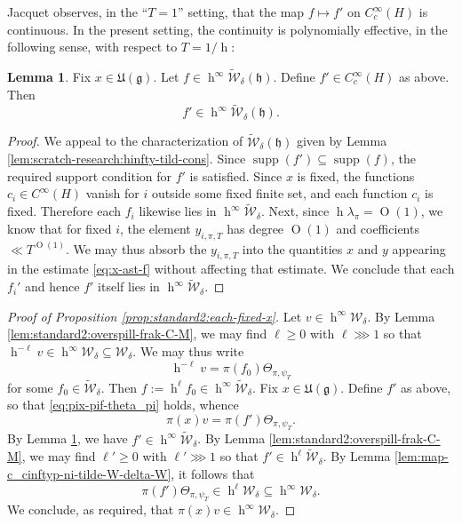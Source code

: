 \documentclass[reqno]{amsart}
\DeclareMathOperator{\h}{h}
\def\O{\operatorname{O}}
\DeclareMathOperator{\supp}{supp}
\theoremstyle{plain} \newtheorem{theorem} {Theorem}
\theoremstyle{definition} \newtheorem{definition} [theorem] {Definition}
\theoremstyle{itplain} %
\newtheorem{lemma}[theorem]{Lemma}
\numberwithin{equation}{section}
\numberwithin{theorem}{section}
\renewcommand{\geq}{\geqslant}
\begin{document}
Jacquet observes, in the ``$T=1$'' setting, that the map $f \mapsto f'$ on $C_c^\infty(H)$ is continuous.  In the present setting, the continuity is polynomially effective, in the following sense, with respect to $T = 1/\h$:
\begin{lemma}\label{lem:scratch-research:fix-x-in}
  Fix $x \in \mathfrak{U}(\mathfrak{g})$.  Let $f \in \h^\infty \tilde{\mathcal{W}}_\delta(\mathfrak{h})$.   Define $f' \in C_c^\infty(H)$ as above.  Then
  \begin{equation*}
    f' \in \h^\infty \tilde{\mathcal{W}}_\delta(\mathfrak{h}).
  \end{equation*}
\end{lemma}
\begin{proof}
  We appeal to the characterization of $\tilde{\mathcal{W}}_\delta(\mathfrak{h})$ given by Lemma \ref{lem:scratch-research:hinfty-tild-cons}.  Since $\supp(f') \subseteq \supp(f)$, the required support condition for $f'$ is satisfied.  Since $x$ is fixed, the functions $c_i \in C^\infty(H)$ vanish for $i$ outside some fixed finite set, and each function $c_i$ is fixed.  Therefore each $f_i$ likewise lies in $\h^\infty \tilde{\mathcal{W}}_\delta$.  Next, since $\h \lambda_\pi = \O(1)$, we know that for fixed $i$, the element $y_{i,\pi,T}$ has degree $\O(1)$ and coefficients $\ll T^{\O(1)}$.  We may thus absorb the $y_{i,\pi,T}$ into the quantities $x$ and $y$ appearing in the estimate \eqref{eq:x-ast-f} without affecting that estimate.  We conclude that each $f_i'$ and hence $f'$ itself lies in $\h^\infty \tilde{\mathcal{W}}_\delta$.
\end{proof}


\begin{proof}[Proof of Proposition \ref{prop:standard2:each-fixed-x}]
  Let $v \in \h^\infty \mathcal{W}_\delta$.  By Lemma \ref{lem:standard2:overspill-frak-C-M}, we may find $\ell \geq 0$ with $\ell \ggg 1$ so that $\h^{-\ell} v \in \h^\infty \mathcal{W}_\delta \subseteq \mathcal{W}_\delta$.  We may thus write
  \begin{equation*}
\h^{-\ell} v = \pi(f_0) \Theta_{\pi,\psi_T}
\end{equation*}
for some $f_0 \in \tilde{\mathcal{W}}_\delta$.  Then $f := \h^{\ell} f_0 \in \h^\infty \tilde{\mathcal{W}}_{\delta}$.  Fix $x \in \mathfrak{U}(\mathfrak{g})$.  Define $f'$ as above, so that \eqref{eq:pix-pif-theta_pi} holds, whence
  \begin{equation*}
    \pi(x) v = \pi(f') \Theta_{\pi,\psi_T}.
  \end{equation*}
  By Lemma \ref{lem:scratch-research:fix-x-in}, we have $f' \in \h^\infty \tilde{\mathcal{W}}_\delta$.  By Lemma \ref{lem:standard2:overspill-frak-C-M}, we may find $\ell ' \geq 0$ with $\ell ' \ggg 1$ so that $f ' \in \h^{\ell} \tilde{\mathcal{W}}_\delta$.  By Lemma \ref{lem:map-c_cinftyp-ni-tilde-W-delta-W}, it follows that
  \begin{equation*}
\pi(f') \Theta_{\pi,\psi_T} \in \h^{\ell} \mathcal{W}_\delta \subseteq \h^\infty \mathcal{W}_\delta.
\end{equation*}
 We conclude, as required, that $\pi(x) v \in \h^\infty \mathcal{W}_\delta$.
\end{proof}
\end{document}
